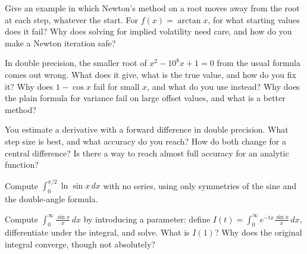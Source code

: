 \begin{question}\label{iq:iv1:calculus-and-optimisation:11}
Give an example in which Newton's method on a root moves away from the root at each step, whatever the start. For $f(x) = \arctan x$, for what starting values does it fail? Why does solving for implied volatility need care, and how do you make a Newton iteration safe?
\end{question}

\begin{question}\label{iq:iv1:calculus-and-optimisation:12}
In double precision, the smaller root of $x^2 - 10^8x + 1 = 0$ from the usual formula comes out wrong. What does it give, what is the true value, and how do you fix it? Why does $1 - \cos x$ fail for small $x$, and what do you use instead? Why does the plain formula for variance fail on large offset values, and what is a better method?
\end{question}

\begin{question}\label{iq:iv1:calculus-and-optimisation:13}
You estimate a derivative with a forward difference in double precision. What step size is best, and what accuracy do you reach? How do both change for a central difference? Is there a way to reach almost full accuracy for an analytic function?
\end{question}

\begin{question}\label{iq:iv1:calculus-and-optimisation:14}
Compute $\int_0^{\pi/2} \ln \sin x\,dx$ with no series, using only symmetries of the sine and the double-angle formula.
\end{question}

\begin{question}\label{iq:iv1:calculus-and-optimisation:15}
Compute $\int_0^\infty \frac{\sin x}{x}\,dx$ by introducing a parameter: define $I(t) = \int_0^\infty e^{-tx}\frac{\sin x}{x}\,dx$, differentiate under the integral, and solve. What is $I(1)$? Why does the original integral converge, though not absolutely?
\end{question}

